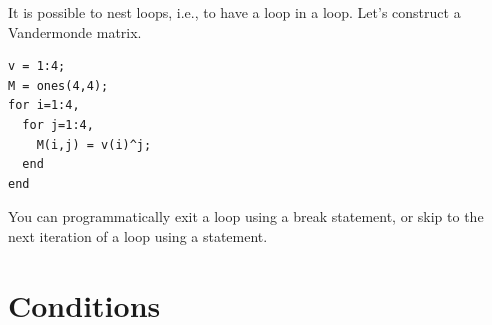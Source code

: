 			It is possible to nest loops, i.e., to have a loop in a loop. 
			Let's construct a Vandermonde matrix.
\begin{lstlisting}
v = 1:4;
M = ones(4,4);
for i=1:4,
  for j=1:4,
    M(i,j) = v(i)^j;
  end
end
\end{lstlisting}



			You can programmatically exit a loop using a break statement, or skip to the next iteration of a loop using a  statement. 

\section{Conditions}








